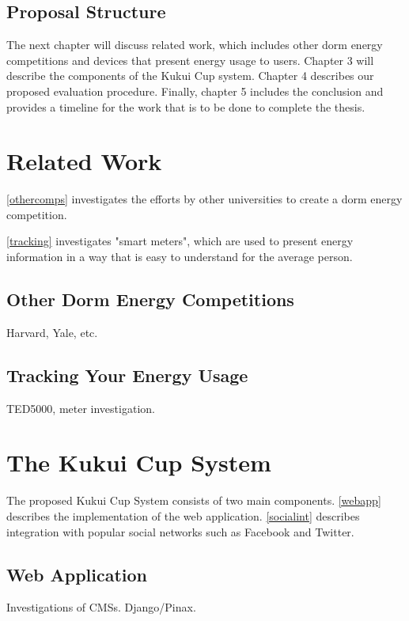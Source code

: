 \section{Proposal Structure}

The next chapter will discuss related work, which includes other dorm energy competitions and devices that present energy usage to users.  Chapter 3 will describe the components of the Kukui Cup system.  Chapter 4 describes our proposed evaluation procedure.  Finally, chapter 5 includes the conclusion and provides a timeline for the work that is to be done to complete the thesis.

\chapter{Related Work}

\autoref{othercomps} investigates the efforts by other universities to create a dorm energy competition.

\autoref{tracking} investigates "smart meters", which are used to present energy information in a way that is easy to understand for the average person.

\section{Other Dorm Energy Competitions}
\label{othercomps}
Harvard, Yale, etc.

\section{Tracking Your Energy Usage}
\label{tracking}
TED5000, meter investigation.

\chapter{The Kukui Cup System}
\label{kukuicup}

The proposed Kukui Cup System consists of two main components.  \autoref{webapp} describes the implementation of the web application.  \autoref{socialint} describes integration with popular social networks such as Facebook and Twitter.

\section{Web Application}
\label{webapp}

Investigations of CMSs.  Django/Pinax.

